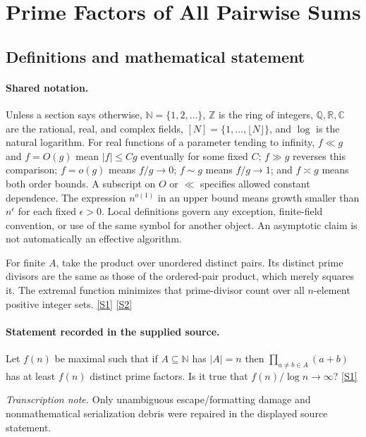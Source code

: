 \documentclass[11pt,a4paper]{article}
\newcommand{\N}{\mathbb{N}}
\newcommand{\Z}{\mathbb{Z}}
\newcommand{\Q}{\mathbb{Q}}
\newcommand{\R}{\mathbb{R}}
\newcommand{\C}{\mathbb{C}}
\newcommand{\sref}[2]{\hyperlink{source:#1:#2}{[S#2]}}
\begin{document}
\section{Prime Factors of All Pairwise Sums}\label{statement}


\subsection{Definitions and mathematical statement}

\paragraph{Shared notation.}Unless a section says otherwise, $\N=\{1,2,\ldots\}$,
$\Z$ is the ring of integers, $\Q,\R,\C$ are the rational, real, and complex
fields, $[N]=\{1,\ldots,\lfloor N\rfloor\}$, and $\log$ is the natural
logarithm. For real functions of a parameter tending to infinity,
$f\ll g$ and $f=O(g)$ mean $|f|\leq Cg$ eventually for some fixed $C$;
$f\gg g$ reverses this comparison; $f=o(g)$ means $f/g\to0$;
$f\sim g$ means $f/g\to1$; and $f\asymp g$ means both order bounds.
A subscript on $O$ or $\ll$ specifies allowed constant dependence.
The expression $n^{o(1)}$ in an upper bound means growth smaller than
$n^\epsilon$ for each fixed $\epsilon>0$. Local definitions govern any
exception, finite-field convention, or use of the same symbol for another
object. An asymptotic claim is not automatically an effective algorithm.



For finite $A$, take the product over unordered distinct pairs. Its distinct prime divisors are the same as those of the ordered-pair product, which merely squares it. The extremal function minimizes that prime-divisor count over all $n$-element positive integer sets. \sref{statement}{1} \sref{statement}{2}

\paragraph{Statement recorded in the supplied source.}
Let $f(n)$ be maximal such that if $A\subseteq\mathbb{N}$ has $\lvert A\rvert=n$ then $\prod_{a\neq b\in A}(a+b)$ has at least $f(n)$ distinct prime factors. Is it true that $f(n)/\log n\to\infty$? \sref{statement}{1}

{\small\emph{Transcription note.} Only unambiguous escape/formatting damage and nonmathematical serialization debris were repaired in the displayed source statement.}
\end{document}
